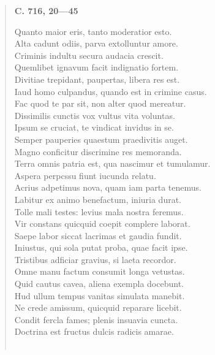 \documentclass[11pt, a4paper]{report}
\begin{document}
\begin{verse}
     \marginpar{[180]} \begin{center} \textbf{C. 716, 20—45} \end{center}Quanto maior eris, tanto moderatior esto. \\ Alta cadunt odiis, parva extolluntur amore. \\ Criminis indultu secura audacia crescit. \\ Quemlibet ignavum facit indignatio fortem. \\ Divitiae trepidant, paupertas, libera res est. \\ Iaud homo culpandus, quando est in crimine casus. \\ Fac quod te par sit, non alter quod mereatur. \\ Dissimilis cunctis vox vultus vita voluntas. \\ Ipsum se cruciat, te vindicat invidus in se. \\ Semper pauperies quaestum praedivitis auget. \\ Magno conficitur discrimine res memoranda. \\ Terra omnis patria est, qua nascimur et tumulamur. \\ Aspera perpcssu fiunt iucunda relatu. \\ Acrius adpetimus nova, quam iam parta tenemus. \\ Labitur ex animo benefactum, iniuria durat. \\ Tolle mali testes: levius mala nostra feremus. \\ Vir constans quicquid coepit complere laborat. \\ Saepe labor siccat lacrimas et gaudia fundit. \\ Iniustus, qui sola putat proba, quae facit ipse. \\ Tristibus adficiar gravius, si laeta recordor. \\ Omne manu factum consumit longa vetustas. \\ Quid cautus cavea, aliena exempla docebunt. \\ Hud ullum tempus vanitas simulata manebit. \\ Ne crede amissum, quicquid reparare licebit. \\ Condit fercla fames; plenis insuavia cuncta. \\ Doctrina est fructus dulcis radicis amarae. \\ 
        ﻿\pagebreak 

\end{verse}
\end{document}
